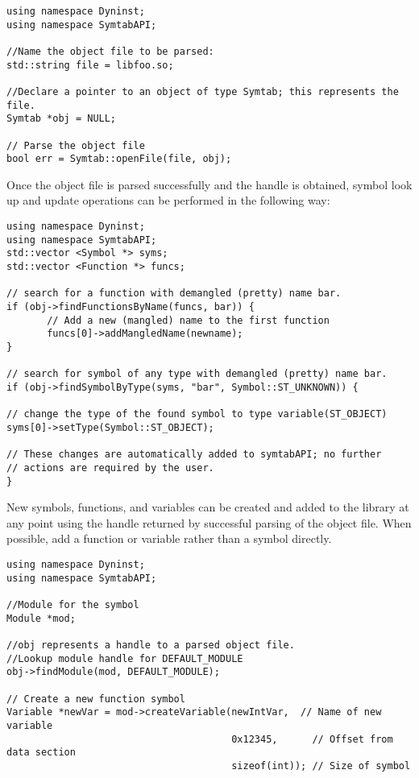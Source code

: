 \lstset{numbers=left, numberstyle=\tiny, stepnumber=5, numbersep=5pt}
\begin{lstlisting}
using namespace Dyninst;
using namespace SymtabAPI;

//Name the object file to be parsed:
std::string file = libfoo.so;

//Declare a pointer to an object of type Symtab; this represents the file.
Symtab *obj = NULL;

// Parse the object file
bool err = Symtab::openFile(file, obj);
\end{lstlisting}

Once the object file is parsed successfully and the handle is obtained, symbol look up and update operations can be performed in the following way:

\begin{lstlisting}
using namespace Dyninst;
using namespace SymtabAPI;
std::vector <Symbol *> syms;
std::vector <Function *> funcs;

// search for a function with demangled (pretty) name bar.
if (obj->findFunctionsByName(funcs, bar)) {
       // Add a new (mangled) name to the first function
       funcs[0]->addMangledName(newname);
}

// search for symbol of any type with demangled (pretty) name bar.
if (obj->findSymbolByType(syms, "bar", Symbol::ST_UNKNOWN)) {

// change the type of the found symbol to type variable(ST_OBJECT)
syms[0]->setType(Symbol::ST_OBJECT);

// These changes are automatically added to symtabAPI; no further
// actions are required by the user.
}
\end{lstlisting}

New symbols, functions, and variables can be created and added to the library at any point using the handle returned by successful parsing of the object file. When possible, add a function or variable rather than a symbol directly. 

\begin{lstlisting}
using namespace Dyninst;
using namespace SymtabAPI;

//Module for the symbol
Module *mod;

//obj represents a handle to a parsed object file.
//Lookup module handle for DEFAULT_MODULE 
obj->findModule(mod, DEFAULT_MODULE);

// Create a new function symbol
Variable *newVar = mod->createVariable(newIntVar,  // Name of new variable
                                       0x12345,      // Offset from data section
                                       sizeof(int)); // Size of symbol 
\end{lstlisting}

